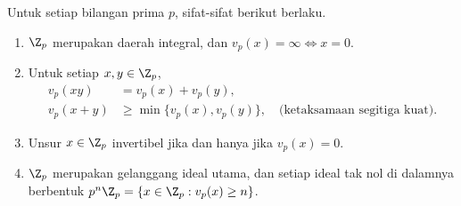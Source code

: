 \begin{proposition}\label{prop:p-adic}
	Untuk setiap bilangan prima $p$, sifat-sifat berikut berlaku.
	\begin{enumerate}
		\item $\Z_p$ merupakan daerah integral, dan $v_p(x) = \infty \iff x=0$.
		\item Untuk setiap $x,y \in \Z_p$,
			\begin{align*}
				v_p(xy) & = v_p(x) + v_p(y), \\
				v_p(x+y) & \geq \min\{v_p(x), v_p(y)\}, \quad \text{(ketaksamaan segitiga kuat)}.
			\end{align*}
		\item Unsur $x \in \Z_p$ invertibel jika dan hanya jika $v_p(x)=0$.
		\item $\Z_p$ merupakan gelanggang ideal utama, dan setiap ideal tak nol di dalamnya berbentuk $p^n \Z_p = \{x \in \Z_p: v_p(x) \geq n \}$.
  \end{enumerate}
\end{proposition}

